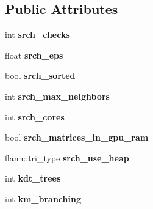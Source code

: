 \subsection*{Public Attributes}
\begin{DoxyCompactItemize}
\item 
\hypertarget{structmtf_1_1FLANNParams_a83074034a1fb55c2ee65bf6017404c12}{int {\bfseries srch\-\_\-checks}}\label{structmtf_1_1FLANNParams_a83074034a1fb55c2ee65bf6017404c12}

\item 
\hypertarget{structmtf_1_1FLANNParams_aedf7dfe210ab32c65c6ce2b045a1aba7}{float {\bfseries srch\-\_\-eps}}\label{structmtf_1_1FLANNParams_aedf7dfe210ab32c65c6ce2b045a1aba7}

\item 
\hypertarget{structmtf_1_1FLANNParams_a407b71164ac2ea95cb681c6028aba8cc}{bool {\bfseries srch\-\_\-sorted}}\label{structmtf_1_1FLANNParams_a407b71164ac2ea95cb681c6028aba8cc}

\item 
\hypertarget{structmtf_1_1FLANNParams_a3c05ce719b88abbaccbf3d8d209b0aea}{int {\bfseries srch\-\_\-max\-\_\-neighbors}}\label{structmtf_1_1FLANNParams_a3c05ce719b88abbaccbf3d8d209b0aea}

\item 
\hypertarget{structmtf_1_1FLANNParams_a60a0456b1972327547419400760b615c}{int {\bfseries srch\-\_\-cores}}\label{structmtf_1_1FLANNParams_a60a0456b1972327547419400760b615c}

\item 
\hypertarget{structmtf_1_1FLANNParams_a99f9d643c3e82a2dca221dcba55d90e4}{bool {\bfseries srch\-\_\-matrices\-\_\-in\-\_\-gpu\-\_\-ram}}\label{structmtf_1_1FLANNParams_a99f9d643c3e82a2dca221dcba55d90e4}

\item 
\hypertarget{structmtf_1_1FLANNParams_a39abcc703ed7048edf5cba3db7453280}{flann\-::tri\-\_\-type {\bfseries srch\-\_\-use\-\_\-heap}}\label{structmtf_1_1FLANNParams_a39abcc703ed7048edf5cba3db7453280}

\item 
\hypertarget{structmtf_1_1FLANNParams_aab9824ca7ff17ceb43332ef9cda0b288}{int {\bfseries kdt\-\_\-trees}}\label{structmtf_1_1FLANNParams_aab9824ca7ff17ceb43332ef9cda0b288}

\item 
\hypertarget{structmtf_1_1FLANNParams_a315ffadd43a9bf13a7056e8496b9d7d2}{int {\bfseries km\-\_\-branching}}\label{structmtf_1_1FLANNParams_a315ffadd43a9bf13a7056e8496b9d7d2}


\end{DoxyCompactItemize}
